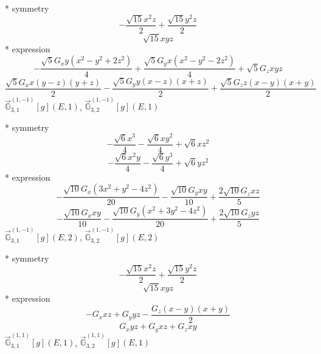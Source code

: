\documentclass[fleqn,8pt]{jsarticle}
\begin{document}
\noindent\quad ** symmetry
\begin{dmath*}
- \frac{\sqrt{15} x^{2} z}{2} + \frac{\sqrt{15} y^{2} z}{2}
\end{dmath*}
\begin{dmath*}
\sqrt{15} x y z
\end{dmath*}
\noindent\quad ** expression
\begin{dmath*}
- \frac{\sqrt{5} G_{x} y \left(x^{2} - y^{2} + 2 z^{2}\right)}{4} + \frac{\sqrt{5} G_{y} x \left(x^{2} - y^{2} - 2 z^{2}\right)}{4} + \sqrt{5} G_{z} x y z
\end{dmath*}
\begin{dmath*}
\frac{\sqrt{5} G_{x} x \left(y - z\right) \left(y + z\right)}{2} - \frac{\sqrt{5} G_{y} y \left(x - z\right) \left(x + z\right)}{2} + \frac{\sqrt{5} G_{z} z \left(x - y\right) \left(x + y\right)}{2}
\end{dmath*}
\noindent\quad $\vec{\mathbb{G}}_{3,1}^{(1,-1)}[g](E,1)$, $\vec{\mathbb{G}}_{3,2}^{(1,-1)}[g](E,1)$

\noindent\quad ** symmetry
\begin{dmath*}
- \frac{\sqrt{6} x^{3}}{4} - \frac{\sqrt{6} x y^{2}}{4} + \sqrt{6} x z^{2}
\end{dmath*}
\begin{dmath*}
- \frac{\sqrt{6} x^{2} y}{4} - \frac{\sqrt{6} y^{3}}{4} + \sqrt{6} y z^{2}
\end{dmath*}
\noindent\quad ** expression
\begin{dmath*}
- \frac{\sqrt{10} G_{x} \left(3 x^{2} + y^{2} - 4 z^{2}\right)}{20} - \frac{\sqrt{10} G_{y} x y}{10} + \frac{2 \sqrt{10} G_{z} x z}{5}
\end{dmath*}
\begin{dmath*}
- \frac{\sqrt{10} G_{x} x y}{10} - \frac{\sqrt{10} G_{y} \left(x^{2} + 3 y^{2} - 4 z^{2}\right)}{20} + \frac{2 \sqrt{10} G_{z} y z}{5}
\end{dmath*}
\noindent\quad $\vec{\mathbb{G}}_{3,1}^{(1,-1)}[g](E,2)$, $\vec{\mathbb{G}}_{3,2}^{(1,-1)}[g](E,2)$

\noindent\quad ** symmetry
\begin{dmath*}
- \frac{\sqrt{15} x^{2} z}{2} + \frac{\sqrt{15} y^{2} z}{2}
\end{dmath*}
\begin{dmath*}
\sqrt{15} x y z
\end{dmath*}
\noindent\quad ** expression
\begin{dmath*}
- G_{x} x z + G_{y} y z - \frac{G_{z} \left(x - y\right) \left(x + y\right)}{2}
\end{dmath*}
\begin{dmath*}
G_{x} y z + G_{y} x z + G_{z} x y
\end{dmath*}
\noindent\quad $\vec{\mathbb{G}}_{3,1}^{(1,1)}[g](E,1)$, $\vec{\mathbb{G}}_{3,2}^{(1,1)}[g](E,1)$
\end{document}
